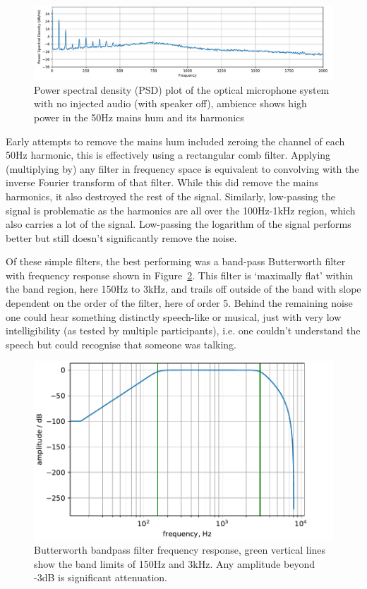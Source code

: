 \documentclass[prb,preprint]{revtex4-1}
\begin{document}
\begin{figure}%
	\includegraphics[width=\textwidth]{podo_noise_psd_zoom-cropped.pdf}
	\caption{Power spectral density (PSD) plot of the optical microphone system with no injected audio (with speaker off), ambience shows high power in the 50Hz mains hum and its harmonics}
	\label{fig:psd_noise}
\end{figure}


Early attempts to remove the mains hum included zeroing the channel of each 50Hz harmonic, this is effectively using a rectangular comb filter. Applying (multiplying by) any filter in frequency space is equivalent to convolving with the inverse Fourier transform of that filter. While this did remove the mains harmonics, it also destroyed the rest of the signal. Similarly, low-passing the signal is problematic as the harmonics are all over the 100Hz-1kHz region, which also carries a lot of the signal. Low-passing the logarithm of the signal performs better but still doesn’t significantly remove the noise.


Of these simple filters, the best performing was a band-pass Butterworth filter with frequency response shown in Figure~\ref{fig:butterworth}. This filter is `maximally flat' within the band region, here 150Hz to 3kHz, and trails off outside of the band with slope dependent on the order of the filter, here of order 5. Behind the remaining noise one could hear something distinctly speech-like or musical, just with very low intelligibility (as tested by multiple participants), i.e. one couldn’t understand the speech but could recognise that someone was talking.


\begin{figure}%
	\includegraphics[width=\textwidth]{butterworth_150_3000-cropped.pdf}
	\caption{Butterworth bandpass filter frequency response, green vertical lines show the band limits of 150Hz and 3kHz. Any amplitude beyond -3dB is significant attenuation.}
	\label{fig:butterworth}
\end{figure}
\end{document}
